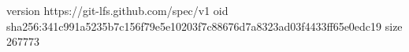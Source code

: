 version https://git-lfs.github.com/spec/v1
oid sha256:341c991a5235b7c156f79e5e10203f7c88676d7a8323ad03f4433ff65e0edc19
size 267773
